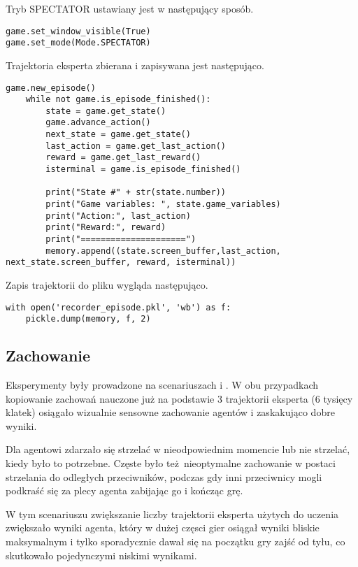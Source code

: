 \vspace{5mm}

Tryb SPECTATOR ustawiany jest w następujący sposób.
\begin{lstlisting}[language=iPython]
game.set_window_visible(True)
game.set_mode(Mode.SPECTATOR)
\end{lstlisting}

Trajektoria eksperta zbierana i zapisywana jest następująco.

\begin{lstlisting}[language=iPython]
    game.new_episode()
    while not game.is_episode_finished():
        state = game.get_state()
        game.advance_action()
        next_state = game.get_state()
        last_action = game.get_last_action()
        reward = game.get_last_reward()
        isterminal = game.is_episode_finished()

        print("State #" + str(state.number))
        print("Game variables: ", state.game_variables)
        print("Action:", last_action)
        print("Reward:", reward)
        print("=====================")
        memory.append((state.screen_buffer,last_action, next_state.screen_buffer, reward, isterminal))
\end{lstlisting}

Zapis trajektorii do pliku wygląda następująco.

\begin{lstlisting}[language=iPython]
with open('recorder_episode.pkl', 'wb') as f:
    pickle.dump(memory, f, 2)
\end{lstlisting}

\subsection{Zachowanie}
Eksperymenty były prowadzone na scenariuszach  i .
W obu przypadkach kopiowanie zachowań nauczone już na podstawie 3 trajektorii eksperta (6 tysięcy klatek) osiągało wizualnie sensowne zachowanie agentów i zaskakująco dobre wyniki.

Dla  agentowi zdarzało się strzelać w nieodpowiednim momencie lub nie strzelać, kiedy było to potrzebne. Częste było też nieoptymalne zachowanie w postaci strzelania do odległych przeciwników, podczas gdy inni przeciwnicy mogli podkraść się za plecy agenta zabijając go i kończąc grę.

W tym scenariuszu zwiększanie liczby trajektorii eksperta użytych do uczenia zwiększało wyniki agenta, który w dużej częsci gier osiągał wyniki bliskie maksymalnym i tylko sporadycznie dawał się na początku gry zajść od tyłu, co skutkowało pojedynczymi niskimi wynikami.

